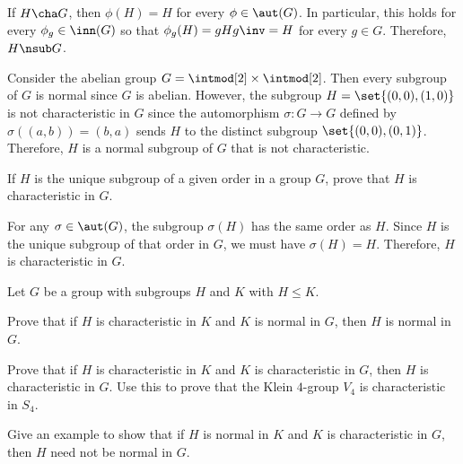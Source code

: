 \begin{sol}
	If $H \cha G$, then $\phi(H) = H$ for every $\phi \in \aut(G)$. In particular, this holds for every $\phi_g \in \inn(G)$ so that $\phi_g(H) = gHg\inv = H$ for every $g \in G$. Therefore, $H \nsub G$.

	Consider the abelian group $G = \intmod[2] \times \intmod[2]$. Then every subgroup of $G$ is normal since $G$ is abelian. However, the subgroup $H = \set{(0,0), (1,0)}$ is not characteristic in $G$ since the automorphism $\sigma : G \to G$ defined by $\sigma((a,b)) = (b,a)$ sends $H$ to the distinct subgroup $\set{(0,0), (0,1)}$. Therefore, $H$ is a normal subgroup of $G$ that is not characteristic.
\end{sol}

\begin{exercise}
	\label{ex4.4.7} If $H$ is the unique subgroup of a given order in a group $G$, prove that $H$ is characteristic in $G$.
\end{exercise}

\begin{sol}
	For any $\sigma \in \aut(G)$, the subgroup $\sigma(H)$ has the same order as $H$. Since $H$ is the unique subgroup of that order in $G$, we must have $\sigma(H) = H$. Therefore, $H$ is characteristic in $G$.
\end{sol}

\begin{specialexercise}
	\label{ex4.4.8} Let $G$ be a group with subgroups $H$ and $K$ with $H \le K$.
	\begin{subproblems}
	\item Prove that if $H$ is characteristic in $K$ and $K$ is normal in $G$, then $H$ is normal in $G$.
	\item Prove that if $H$ is characteristic in $K$ and $K$ is characteristic in $G$, then $H$ is characteristic in $G$. Use this to prove that the Klein $4$-group $V_4$ is characteristic in $S_4$.
	\item Give an example to show that if $H$ is normal in $K$ and $K$ is characteristic in $G$, then $H$ need not be normal in $G$.
	\end{subproblems}
\end{specialexercise}

